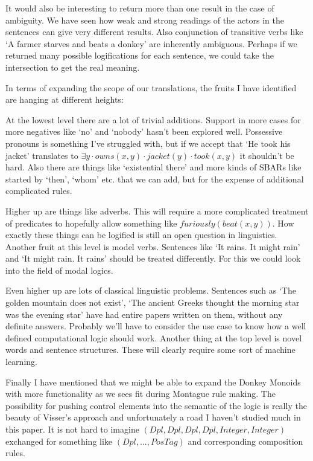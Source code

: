 \documentclass[12pt]{article}
\begin{document}
It would also be interesting to return more than one result in the case of ambiguity. We have seen how weak and strong readings of the actors in the sentences can give very different results. Also conjunction of transitive verbs like `A farmer starves and beats a donkey' are inherently ambiguous. Perhaps if we returned many possible logifications for each sentence, we could take the intersection to get the real meaning.

In terms of expanding the scope of our translations, the fruits I have identified are hanging at different heights:

At the lowest level there are a lot of trivial additions. Support in more cases for more negatives like `no' and `nobody' hasn't been explored well. Possessive pronouns is something I've struggled with, but if we accept that `He took his jacket' translates to $\exists y\cdot owns(x,y)\cdot jacket(y)\cdot took(x,y)$ it shouldn't be hard. Also there are things like `existential there' and more kinds of SBARs like started by `then', `whom' etc. that we can add, but for the expense of additional complicated rules.

Higher up are things like adverbs. This will require a more complicated treatment of predicates to hopefully allow something like $furiously(beat(x,y))$. How exactly these things can be logified is still an open question in linguistics. Another fruit at this level is model verbs. Sentences like `It rains. It might rain' and `It might rain. It rains' should be treated differently. For this we could look into the field of modal logics.

Even higher up are lots of classical linguistic problems. Sentences such as `The golden mountain does not exist', `The ancient Greeks thought the morning star was the evening star' have had entire papers written on them, without any definite answers. Probably we'll have to consider the use case to know how a well defined computational logic should work. Another thing at the top level is novel words and sentence structures. These will clearly require some sort of machine learning.

Finally I have mentioned that we might be able to expand the Donkey Monoids with more functionality as we sees fit during Montague rule making. The possibility for pushing control elements into the semantic of the logic is really the beauty of Visser's approach and unfortunately a road I haven't studied much in this paper. It is not hard to imagine $(Dpl,Dpl,Dpl,Dpl,Integer,Integer)$ exchanged for something like $(Dpl,...,PosTag)$ and corresponding composition rules.
\end{document}
